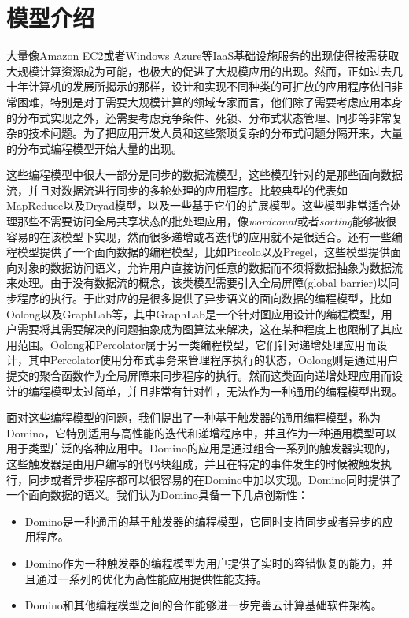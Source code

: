 \section{模型介绍}
\label{section:intro}
大量像Amazon EC2或者Windows Azure等IaaS基础设施服务的出现使得按需获取大规模计算资源成为可能，也极大的促进了大规模应用的出现。然而，正如过去几十年计算机的发展所揭示的那样，设计和实现不同种类的可扩放的应用程序依旧非常困难，特别是对于需要大规模计算的领域专家而言，他们除了需要考虑应用本身的分布式实现之外，还需要考虑竞争条件、死锁、分布式状态管理、同步等非常复杂的技术问题。为了把应用开发人员和这些繁琐复杂的分布式问题分隔开来，大量的分布式编程模型开始大量的出现。

这些编程模型中很大一部分是同步的数据流模型，这些模型针对的是那些面向数据流，并且对数据流进行同步的多轮处理的应用程序。比较典型的代表如MapReduce以及Dryad模型，以及一些基于它们的扩展模型。这些模型非常适合处理那些不需要访问全局共享状态的批处理应用，像\textit{wordcount}或者\textit{sorting}能够被很容易的在该模型下实现，然而很多递增或者迭代的应用就不是很适合。还有一些编程模型提供了一个面向数据的编程模型，比如Piccolo以及Pregel，这些模型提供面向对象的数据访问语义，允许用户直接访问任意的数据而不须将数据抽象为数据流来处理。由于没有数据流的概念，该类模型需要引入全局屏障(global barrier)以同步程序的执行。于此对应的是很多提供了异步语义的面向数据的编程模型，比如Oolong以及GraphLab等，其中GraphLab是一个针对图应用设计的编程模型，用户需要将其需要解决的问题抽象成为图算法来解决，这在某种程度上也限制了其应用范围。Oolong和Percolator属于另一类编程模型，它们针对递增处理应用而设计，其中Percolator使用分布式事务来管理程序执行的状态，Oolong则是通过用户提交的聚合函数作为全局屏障来同步程序的执行。然而这类面向递增处理应用而设计的编程模型太过简单，并且非常有针对性，无法作为一种通用的编程模型出现。

面对这些编程模型的问题，我们提出了一种基于触发器的通用编程模型，称为Domino，它特别适用与高性能的迭代和递增程序中，并且作为一种通用模型可以用于类型广泛的各种应用中。Domino的应用是通过组合一系列的触发器实现的，这些触发器是由用户编写的代码块组成，并且在特定的事件发生的时候被触发执行，同步或者异步程序都可以很容易的在Domino中加以实现。Domino同时提供了一个面向数据的语义。我们认为Domino具备一下几点创新性：

\begin{itemize}
\item Domino是一种通用的基于触发器的编程模型，它同时支持同步或者异步的应用程序。
\item Domino作为一种触发器的编程模型为用户提供了实时的容错恢复的能力，并且通过一系列的优化为高性能应用提供性能支持。
\item Domino和其他编程模型之间的合作能够进一步完善云计算基础软件架构。
\end{itemize}

